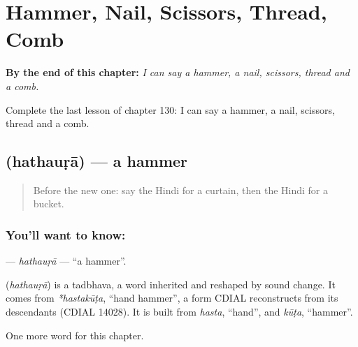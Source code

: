 
\chapter{Hammer, Nail, Scissors, Thread, Comb}
\label{ch:hi-hammer-nail-scissors-thread-comb}

\begin{chapteropening}
\textbf{By the end of this chapter:} \emph{I can say a hammer, a nail, scissors, thread and a comb.}

Complete the last lesson of chapter 130: I can say a hammer, a nail, scissors, thread and a comb.
\end{chapteropening}

\section[\texorpdfstring{\hi{हथौड़ा} (hathauṛā)}{हथौड़ा (hathauṛā)}]{ (hathauṛā) — a hammer}

\label{lesson:HI-C130-hathaura}



\begin{quote}
Before the new one: say the Hindi for a curtain, then the Hindi for a bucket.
\end{quote}

\subsection*{You'll want to know: }
\textbf{} — \emph{hathauṛā} — \textquotedblleft{}a hammer\textquotedblright{}.

\begin{cousinweb}
\textbf{} (\emph{hathauṛā}) is a tadbhava, a word inherited and reshaped by sound change. It comes from \emph{*hastakūṭa}, \textquotedblleft{}hand hammer\textquotedblright{}, a form CDIAL reconstructs from its descendants (CDIAL 14028). It is built from \emph{hasta}, \textquotedblleft{}hand\textquotedblright{}, and \emph{kūṭa}, \textquotedblleft{}hammer\textquotedblright{}.
\end{cousinweb}

\begin{grammarlens}[title={What you've built}]
One more word for this chapter.
\end{grammarlens}


